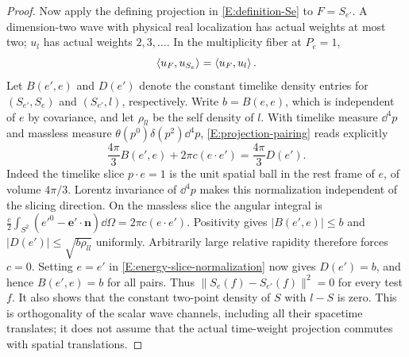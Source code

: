 \begin{proof}
Now apply the defining projection in \eqref{E:definition-Se} to
$F=S_{e'}$.  A dimension-two wave with physical real localization has actual weights at most
two; $u_l$ has actual weights $2,3,\ldots$.  In the multiplicity fiber
at $P_e=1$,
\begin{equation}\label{E:projection-pairing}
 \left\langle u_F,u_{S_e}\right\rangle=\left\langle u_F,u_l\right\rangle.
\end{equation}
Let $B(e',e)$ and $D(e')$ denote the constant timelike density
entries for $(S_{e'},S_e)$ and $(S_{e'},l)$, respectively.  Write
$b=B(e,e)$, which is independent of $e$ by covariance, and let
$\rho_{ll}$ be the self density of $l$.  With timelike measure
$\dd^4p$ and massless measure $\theta(p^0)\delta(p^2)\dd^4p$,
\eqref{E:projection-pairing} reads explicitly
\begin{equation}\label{E:energy-slice-normalization}
 \frac{4\pi}{3}B(e',e)+2\pi c(e\cdot e')
   =\frac{4\pi}{3}D(e').
\end{equation}
Indeed the timelike slice $p\cdot e=1$ is the unit spatial ball
in the rest frame of $e$, of volume $4\pi/3$.  Lorentz invariance
of $\dd^4p$ makes this normalization independent of the slicing
direction.  On the massless slice the angular integral is
$\frac c2\int_{S^2}(e'^0-\boldsymbol e'\cdot\boldsymbol n)\dd\Omega
=2\pi c(e\cdot e')$.  Positivity gives
$|B(e',e)|\leq b$ and $|D(e')|\leq\sqrt{b\rho_{ll}}$ uniformly.
Arbitrarily large relative rapidity therefore forces $c=0$.
Setting $e=e'$ in \eqref{E:energy-slice-normalization} now gives
$D(e')=b$, and hence $B(e',e)=b$ for all pairs.  Thus
$\|S_e(f)-S_{e'}(f)\|^2=0$ for every test $f$.
It also shows that the constant two-point density of $S$ with $l-S$
is zero.  This is orthogonality of the scalar wave channels, including
all their spacetime translates; it does not assume that the actual
time-weight projection commutes with spatial translations.


\end{proof}
